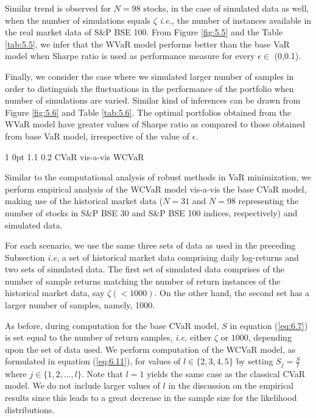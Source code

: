 \documentclass[12pt]{article}
\makeatletter
\numberwithin{equation}{section}
\renewcommand{\subsection}{
  \@startsection
  {subsection}%
  {1}%
  {0pt}%
  {1.1\baselineskip}%
  {0.2\baselineskip}%
  {\sc \centering}%
}
\makeatother
\begin{document}
Similar trend is observed for $N=98$ stocks, in the case of simulated data as well, when the number of simulations equals $\zeta$ \textit{i.e.,} the number of instances available in the real market data of S\&P BSE 100. From Figure \ref{fig:5.5} and the Table \ref{tab:5.5}, we infer that the WVaR model performs better than the base VaR model when Sharpe ratio is used as performance measure for every $\epsilon \in$ (0,0.1).

Finally, we consider the case where we simulated larger number of samples in order to distinguish the fluctuations in the performance of the portfolio when number of simulations are varied. Similar kind of inferences can be drawn from Figure \ref{fig:5.6} and Table \ref{tab:5.6}. The optimal portfolios obtained from the WVaR model have greater values of Sharpe ratio as compared to those obtained from base VaR model, irrespective of the value of $\epsilon$.

\subsection{CVaR vis-a-vis WCVaR}

Similar to the computational analysis of robust methods in VaR minimization, we perform empirical analysis of the WCVaR  model vis-a-vis the base CVaR model, making use of the historical market data ($N=31$ and $N=98$ representing the number of stocks in S\&P BSE 30 and S\&P BSE 100 indices, respectively) and simulated data.

For each scenario, we use the same three sets of data as used in the preceding Subsection \textit{i.e,} a set of historical market data comprising daily log-returns and two sets of simulated data. The first set of simulated data comprises of the number of sample returns matching the number of return instances of the historical market data, say $\zeta (<1000)$. On the other hand, the second set has a larger number of samples, namely, 1000.

As before, during computation for the base CVaR model, $S$ in equation (\ref{eq:6.7}) is set equal to the number of return samples, \textit{i.e,} either $\zeta$ or $1000$, depending upon the set of data used. We perform computation of the WCVaR model, as formulated in equation (\ref{eq:6.11}), for values of
$l \in \{2,3,4,5\}$ by setting $\displaystyle{S_{j}=\frac{S}{l}}$ where $\displaystyle{j \in \{1,2,\dots,l\}}$. Note that $l=1$ yields the same case as the classical CVaR model. We do not include larger values of $l$ in the discussion on the empirical results since this leads to a great decrease in the sample size for the likelihood distributions.
\end{document}

